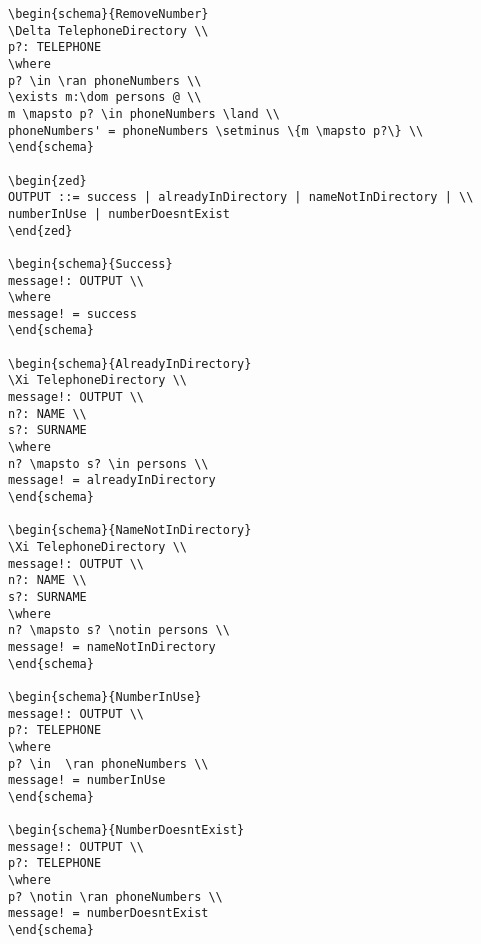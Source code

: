 \begin{verbatim}
\begin{schema}{RemoveNumber}
\Delta TelephoneDirectory \\
p?: TELEPHONE
\where
p? \in \ran phoneNumbers \\
\exists m:\dom persons @ \\
m \mapsto p? \in phoneNumbers \land \\
phoneNumbers' = phoneNumbers \setminus \{m \mapsto p?\} \\
\end{schema}

\begin{zed}
OUTPUT ::= success | alreadyInDirectory | nameNotInDirectory | \\
numberInUse | numberDoesntExist
\end{zed}

\begin{schema}{Success}
message!: OUTPUT \\
\where
message! = success
\end{schema}

\begin{schema}{AlreadyInDirectory}
\Xi TelephoneDirectory \\
message!: OUTPUT \\
n?: NAME \\
s?: SURNAME
\where
n? \mapsto s? \in persons \\
message! = alreadyInDirectory
\end{schema}

\begin{schema}{NameNotInDirectory}
\Xi TelephoneDirectory \\
message!: OUTPUT \\
n?: NAME \\
s?: SURNAME
\where
n? \mapsto s? \notin persons \\
message! = nameNotInDirectory
\end{schema}

\begin{schema}{NumberInUse}
message!: OUTPUT \\
p?: TELEPHONE
\where
p? \in  \ran phoneNumbers \\
message! = numberInUse
\end{schema}

\begin{schema}{NumberDoesntExist}
message!: OUTPUT \\
p?: TELEPHONE
\where
p? \notin \ran phoneNumbers \\
message! = numberDoesntExist
\end{schema}


\end{verbatim}
